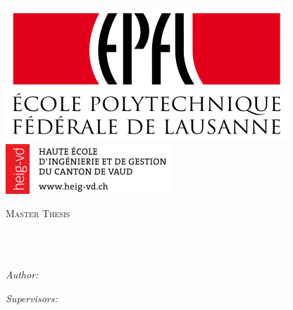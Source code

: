 \documentclass[11pt,english,singlespacing,headsepline]{MastersDoctoralThesis} %
\author{Jordan \textsc{Voirin}} %
\begin{document}
\frontmatter %

\pagestyle{plain} %


\begin{titlepage}
\begin{center}

\includegraphics[scale=.25]{Logo/Logo_EPFL.png} \hfill
\includegraphics[scale=.625]{Logo/HEIG-VD_Logo.png} \\[1cm]

{\scshape\LARGE \univname\par}\vspace{1.2cm} %
\textsc{\Large Master Thesis}\\[0.5cm] %

\HRule \\[0.4cm] %
{\huge \bfseries \ttitle\par}\vspace{0.4cm} %
\HRule \\[1.5cm] %
 
\begin{minipage}[t]{0.4\textwidth}
\begin{flushleft} \large
\emph{Author:}\\
{\authorname} %
\end{flushleft}
\end{minipage}
\begin{minipage}[t]{0.4\textwidth}
\begin{flushright} \large
\emph{Supervisors:} \\
\href{https://www.researchgate.net/profile/Laurent_Jolissaint/publications}{\supname}\\ %
\href{https://people.epfl.ch/cgi-bin/people?id=222189&op=bio}{\cosupname}
\end{flushright}
\end{minipage}\\[3cm]
 

\end{center}
\end{titlepage}
\end{document}
